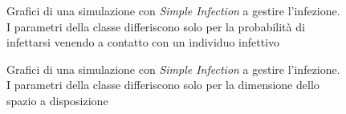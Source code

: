 \documentclass[a4paper,10pt,twocolumn]{article}
\begin{document}
\begin{figure}[p]
    \centering
    \caption{Grafici di una simulazione con \emph{Simple Infection} a gestire l'infezione. I parametri della classe differiscono solo per la probabilità di infettarsi venendo a contatto con un individuo infettivo}
    \label{fig:simple}
\end{figure}

\begin{figure}[p]
    \centering
    \caption{Grafici di una simulazione con \emph{Simple Infection} a gestire l'infezione. I parametri della classe differiscono solo per la dimensione dello spazio a disposizione}
\end{figure}
\end{document}
